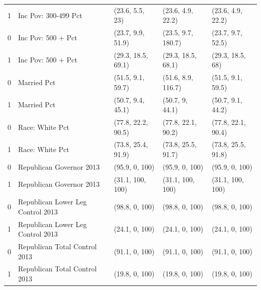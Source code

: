 \begin{table}[ht]
\begin{tabular}{rllll}
  1 & Inc Pov: 300-499 Pct & (23.6, 5.5, 23) & (23.6, 4.9, 22.2) & (23.6, 4.9, 22.2) \\ 
  0 & Inc Pov: 500 + Pct & (23.7, 9.9, 51.9) & (23.5, 9.7, 180.7) & (23.7, 9.7, 52.5) \\ 
  1 & Inc Pov: 500 + Pct & (29.3, 18.5, 69.1) & (29.3, 18.5, 68.1) & (29.3, 18.5, 68) \\ 
  0 & Married Pct & (51.5, 9.1, 59.7) & (51.6, 8.9, 116.7) & (51.5, 9.1, 59.5) \\ 
  1 & Married Pct & (50.7, 9.4, 45.1) & (50.7, 9, 44.1) & (50.7, 9.1, 44.2) \\ 
  0 & Race: White Pct & (77.8, 22.2, 90.5) & (77.8, 22.1, 90.2) & (77.8, 22.1, 90.4) \\ 
  1 & Race: White Pct & (73.8, 25.4, 91.9) & (73.8, 25.5, 91.7) & (73.8, 25.5, 91.8) \\ 
  0 & Republican Governor 2013 & (95.9, 0, 100) & (95.9, 0, 100) & (95.9, 0, 100) \\ 
  1 & Republican Governor 2013 & (31.1, 100, 100) & (31.1, 100, 100) & (31.1, 100, 100) \\ 
  0 & Republican Lower Leg Control 2013 & (98.8, 0, 100) & (98.8, 0, 100) & (98.8, 0, 100) \\ 
  1 & Republican Lower Leg Control 2013 & (24.1, 0, 100) & (24.1, 0, 100) & (24.1, 0, 100) \\ 
  0 & Republican Total Control 2013 & (91.1, 0, 100) & (91.1, 0, 100) & (91.1, 0, 100) \\ 
  1 & Republican Total Control 2013 & (19.8, 0, 100) & (19.8, 0, 100) & (19.8, 0, 100) \\ 
   \hline
\end{tabular}
\end{table}

